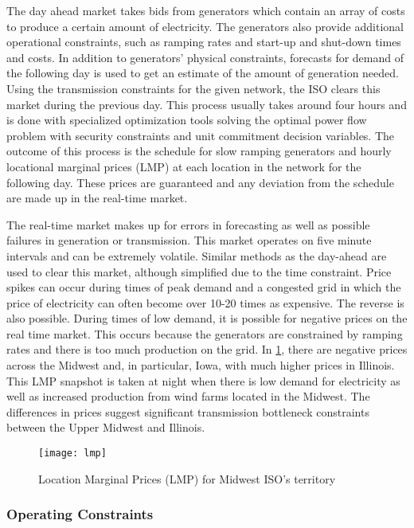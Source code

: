 The day ahead market takes bids from generators which contain an array of costs to produce a certain amount of electricity.  The generators also provide additional operational constraints, such as ramping rates and start-up and shut-down times and costs.  In addition to generators' physical constraints, forecasts for demand of the following day is used to get an estimate of the amount of generation needed.  Using the transmission constraints for the given network, the ISO clears this market during the previous day.  This process usually takes around four hours and is done with specialized optimization tools solving the optimal power flow problem with security constraints and unit commitment decision variables.  The outcome of this process is the schedule for slow ramping generators and hourly locational marginal prices (LMP) at each location in the network for the following day.  These prices are guaranteed and any deviation from the schedule are made up in the real-time market.	

The real-time market makes up for errors in forecasting as well as possible failures in generation or transmission.  This market operates on five minute intervals and can be extremely volatile.  Similar methods as the day-ahead are used to clear this market, although simplified due to the time constraint.  Price spikes can occur during times of peak demand and a congested grid in which the price of electricity can often become over 10-20 times as expensive.  The reverse is also possible.  During times of low demand, it is possible for negative prices on the real time market.  This occurs because the generators are constrained by ramping rates and there is too much production on the grid. In \cref{fig:lmpmiso}, there are negative prices across the Midwest and, in particular, Iowa, with much higher prices in Illinois.  This LMP snapshot is taken at night when there is low demand for electricity as well as increased production from wind farms located in the Midwest.  The differences in prices suggest significant transmission bottleneck constraints between the Upper Midwest and Illinois.   


\begin{figure}
\centering
\texttt{[image: lmp]}  
\caption{Location Marginal Prices (LMP) for Midwest ISO's territory}
\label{fig:lmpmiso}
\end{figure}


\subsubsection{Operating Constraints}


